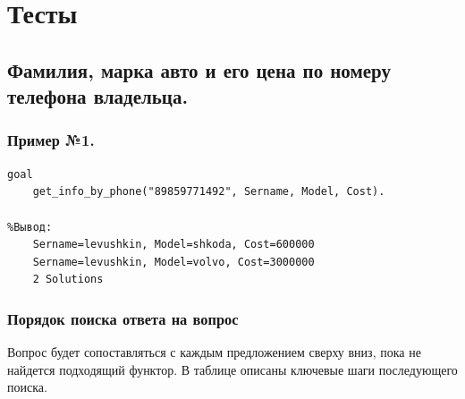 \documentclass[a4paper,12pt]{article}
\begin{document}
	\newpage
	
	\section*{Тесты}
	
	\subsection*{Фамилия, марка авто и его цена по номеру телефона владельца.}
	
	\subsubsection*{Пример №1.}
	
	\begin{verbatim}
goal
	get_info_by_phone("89859771492", Sername, Model, Cost).
	
%Вывод:
	Sername=levushkin, Model=shkoda, Cost=600000
	Sername=levushkin, Model=volvo, Cost=3000000
	2 Solutions
	\end{verbatim}
	
	\newpage
	
	\subsubsection*{Порядок поиска ответа на вопрос}
	
	Вопрос будет сопоставляться с каждым предложением сверху вниз, пока не
	найдется подходящий функтор. В таблице описаны ключевые шаги последующего поиска.
	
\end{document}
